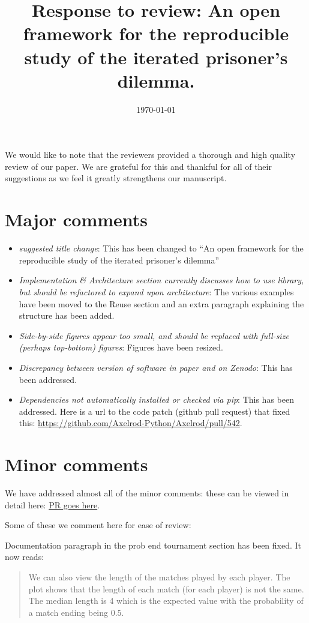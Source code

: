 \documentclass{article}
\title{Response to review: An open framework for the reproducible study of the
iterated prisoner's dilemma.}
\date{\today}
\begin{document}
\maketitle

We would like to note that the reviewers provided a thorough and high quality
review of our paper. We are grateful for this and thankful for all of their
suggestions as we feel it greatly strengthens our manuscript.

\section{Major comments}


\begin{itemize}
\item \textit{suggested title change}: This has been changed to ``An open
    framework for the reproducible study of the iterated prisoner's dilemma''
\item \textit{Implementation \& Architecture section currently discusses how to
    use library, but should be refactored to expand upon architecture}: The
    various examples have been moved to the Reuse section and an extra paragraph
    explaining the structure has been added.
\item \textit{Side-by-side figures appear too small, and should be replaced with
    full-size (perhaps top-bottom) figures}: Figures have been resized.
\item \textit{Discrepancy between version of software in paper and on Zenodo}:
    This has been addressed.
\item \textit{Dependencies not automatically installed or checked via pip}: This
    has been addressed. Here is a url to the code patch (github pull request)
    that fixed this: \url{https://github.com/Axelrod-Python/Axelrod/pull/542}.
\end{itemize}

\section{Minor comments}

We have addressed almost all of the minor comments: these can be viewed in
detail here: \url{PR goes here}.

Some of these we comment here for ease of review:

Documentation paragraph in the prob end tournament section has been fixed. It
now reads:

\begin{quote}
    We can also view the length of the matches played by each player. The plot
    shows that the length of each match (for each player) is not the same. The
    median length is 4 which is the expected value with the probability of a
    match ending being 0.5.
\end{quote}
\end{document}
